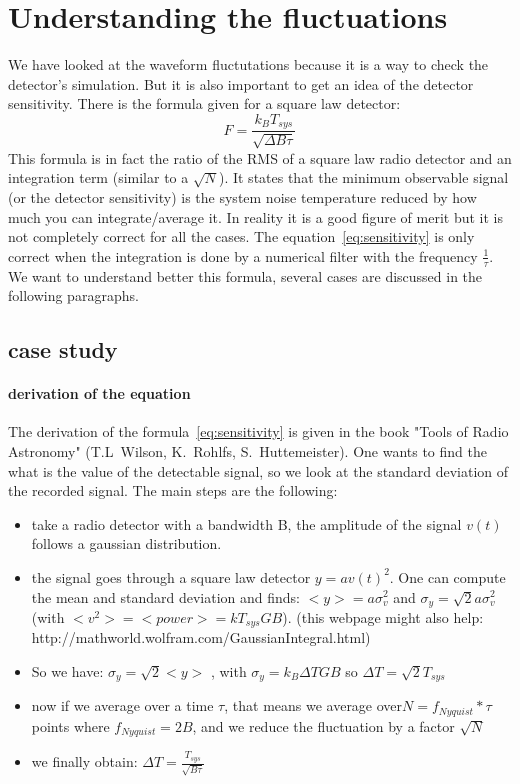 \section{Understanding the fluctuations}
We have  looked at the waveform  fluctutations because it is  a way to
check the  detector's simulation. But it  is also important  to get an
idea of  the detector  sensitivity. There is  the formula given  for a
square law detector:
\begin{equation}
  F = \frac{k_{B} T_{sys}}{\sqrt{\Delta B \tau}}
  \label{eq:sensitivity}
\end{equation}
This formula  is in fact the  ratio of the  RMS of a square  law radio
detector and an integration term (similar to a $\sqrt{N}$).  It states
that the  minimum observable signal  (or the detector  sensitivity) is
the   system  noise   temperature  reduced   by  how   much   you  can
integrate/average it. In  reality it is a good figure  of merit but it
is    not   completely    correct    for   all    the   cases.     The
equation~\ref{eq:sensitivity} is only  correct when the integration is
done  by a numerical  filter with  the frequency  $\frac{1}{\tau}$. We
want to understand better this formula, several cases are discussed in
the following paragraphs.


\subsection{case study}
\paragraph{derivation of the equation}
The  derivation of  the formula~\ref{eq:sensitivity}  is given  in the
book    "Tools   of    Radio   Astronomy"    (T.L~Wilson,   K.~Rohlfs,
S.~Huttemeister).  One wants  to find  the what  is the  value  of the
detectable  signal,  so we  look  at  the  standard deviation  of  the
recorded signal. The main steps are the following:
\begin{itemize}
\item take a radio detector with a bandwidth B, the amplitude of the signal $v(t)$ follows a gaussian distribution.
\item the signal goes through a square law detector $y = av(t)^2$. One
  can  compute the  mean  and  standard deviation  and  finds: $<y>  =
  a\sigma_v^2$ and $\sigma_y = \sqrt{2}a\sigma_v^2$ (with $<v^2> = <power> =
  kT_{sys}     G    B$).    (this     webpage    might     also    help:
  http://mathworld.wolfram.com/GaussianIntegral.html)
\item So we have: $\sigma_y = \sqrt{2} <y> $ , with $\sigma_y = k_B \Delta
  T G B$ so $\Delta T = \sqrt{2} T_{sys}$
\item now  if we  average over  a time $\tau$,  that means  we average
  over$ N = f_{Nyquist}*\tau$ points where $f_{Nyquist} = 2B$, and we reduce the fluctuation by a factor $\sqrt{N}$
\item we finally obtain: $\Delta T = \frac{T_{sys}}{\sqrt{B\tau}}$
\end{itemize}

